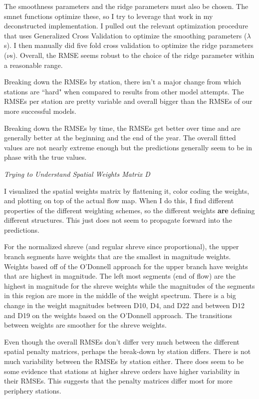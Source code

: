 \documentclass[12pt]{amsart}
\begin{document}
The smoothness parameters and the ridge parameters must also be chosen. The smnet functions optimize these, so I try to leverage that work in my deconstructed implementation. I pulled out the relevant optimization procedure that uses Generalized Cross Validation to optimize the smoothing parameters ($\lambda$s). I then manually did five fold cross validation to optimize the ridge parameters ($\nu$s). Overall, the RMSE seems robust to the choice of the ridge parameter within a reasonable range. 

Breaking down the RMSEs by station, there isn't a major change from which stations are ``hard" when compared to results from other model attempts. The RMSEs per station are pretty variable and overall bigger than the RMSEs of our more successful models. 

Breaking down the RMSEs by time, the RMSEs get better over time and are generally better at the beginning and the end of the year. The overall fitted values are not nearly extreme enough but the predictions generally seem to be in phase with the true values.

\textit{Trying to Understand Spatial Weights Matrix D}

I visualized the spatial weights matrix by flattening it, color coding the weights, and plotting on top of the actual flow map. When I do this, I find different properties of the different weighting schemes, so the different weights \textbf{are} defining different structures. This just does not seem to propagate forward into the predictions.


For the normalized shreve (and regular shreve since proportional), the upper branch segments have weights that are the smallest in magnitude weights. Weights based off of the O'Donnell approach for the upper branch have weights that are highest in magnitude.  The left most segments (end of flow) are the highest in magnitude for the shreve weights while the magnitudes of the segments in this region are more in the middle of the weight spectrum. There is a big change in the weight magnitudes between D10, D4, and D22 and between D12 and D19 on the weights based on the O'Donnell approach. The transitions between weights are smoother for the shreve weights.

Even though the overall RMSEs don't differ very much between the different spatial penalty matrices, perhaps the break-down by station differs. There is not much variability between the RMSEs by station either. There does seem to be some evidence that stations at higher shreve orders have higher variability in their RMSEs. This suggests that the penalty matrices differ most for more periphery stations.







\textbf{}
\end{document}
